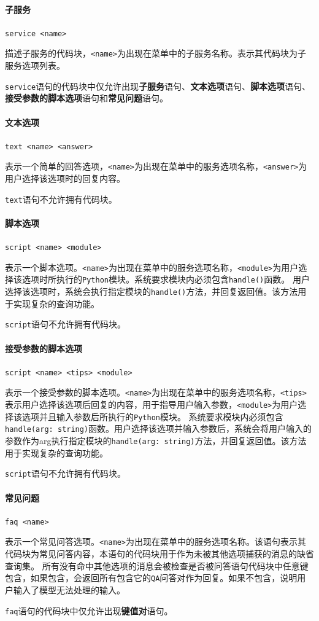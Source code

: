 \documentclass[hyperref]{ctexart}
\begin{document}
\paragraph{子服务}
\texttt{service <name>}
\par 描述子服务的代码块，\texttt{<name>}为出现在菜单中的子服务名称。表示其代码块为子服务选项列表。
\par \texttt{service}语句的代码块中仅允许出现{\bf 子服务}语句、{\bf 文本选项}语句、{\bf 脚本选项}语句、{\bf 接受参数的脚本选项}语句和{\bf 常见问题}语句。
\paragraph{文本选项}
\texttt{text <name> <answer>}
\par 表示一个简单的回答选项，\texttt{<name>}为出现在菜单中的服务选项名称，\texttt{<answer>}为用户选择该选项时的回复内容。
\par \texttt{text}语句不允许拥有代码块。
\paragraph{脚本选项}
\texttt{script <name> <module>}
\par 表示一个脚本选项。\texttt{<name>}为出现在菜单中的服务选项名称，\texttt{<module>}为用户选择该选项时所执行的\texttt{Python}模块。系统要求模块内必须包含\texttt{handle()}函数。
用户选择该选项时，系统会执行指定模块的\texttt{handle()}方法，并回复返回值。该方法用于实现复杂的查询功能。
\par \texttt{script}语句不允许拥有代码块。
\paragraph{接受参数的脚本选项}
\texttt{script <name> <tips> <module>}
\par 表示一个接受参数的脚本选项。\texttt{<name>}为出现在菜单中的服务选项名称，\texttt{<tips>}表示用户选择该选项后回复的内容，用于指导用户输入参数，\texttt{<module>}为用户选择该选项并且输入参数后所执行的\texttt{Python}模块。
系统要求模块内必须包含\texttt{handle(arg: string)}函数。用户选择该选项并输入参数后，系统会将用户输入的参数作为arg执行指定模块的\texttt{handle(arg: string)}方法，并回复返回值。该方法用于实现复杂的查询功能。
\par \texttt{script}语句不允许拥有代码块。
\paragraph{常见问题}
\texttt{faq <name>}
\par 表示一个常见问答选项。\texttt{<name>}为出现在菜单中的服务选项名称。该语句表示其代码块为常见问答内容，本语句的代码块用于作为未被其他选项捕获的消息的缺省查询集。
所有没有命中其他选项的消息会被检查是否被问答语句代码块中任意键包含，如果包含，会返回所有包含它的\texttt{QA}问答对作为回复。如果不包含，说明用户输入了模型无法处理的输入。
\par \texttt{faq}语句的代码块中仅允许出现{\bf 键值对}语句。
\end{document}
